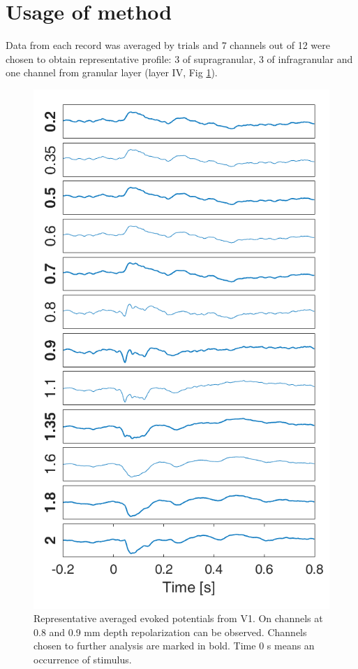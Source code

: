 \documentclass{pracalicmgr}
\begin{document}
    \section{Usage of method}
    Data from each record was averaged by trials and 7 channels out of 12 were chosen to obtain representative profile: 3 of supragranular, 3 of infragranular and one channel from granular layer (layer IV,  Fig \ref{rys:wybieranie_kanalow}).
     
    \begin{figure}[H]
    \begin{center}
    		\includegraphics[scale=0.5]{wybieranie_kanalow.png}
    	\end{center}
    	\caption{ Representative averaged evoked potentials from V1. On channels at 0.8 and 0.9 mm depth repolarization can be observed. Channels chosen to further analysis are marked in bold. Time 0 s means an occurrence of stimulus.}
    	\label{rys:wybieranie_kanalow}
    \end{figure} 
\end{document}
